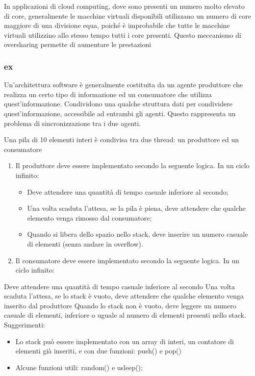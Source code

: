 \documentclass{article}
\numberwithin{equation}{subsection}
\begin{document}
In applicazioni di cloud computing, dove sono presenti un numero molto elevato di core, generalmente le macchine virtuali disponibili utilizzano un numero di core maggiore 
di una divisione equa, poiché è improbabile che tutte le macchine virtuali utilizzino allo stesso tempo tutti i core presenti. Questo meccanismo di oversharing permette 
di aumentare le prestazioni 

\subsubsection*{ex}

Un'architettura software è generalmente costituita da un agente produttore che realizza un certo tipo di informazione ed un consumatore che utilizza quest'informazione. 
Condividono una qualche struttura dati per condividere quest'informazione, accessibile ad entrambi gli agenti. Questo rappresenta un problema di sincronizzazione tra 
i due agenti. 

Una pila di 10 elementi interi è condivisa tra due thread: un produttore ed un consumatore

\begin{enumerate}
    \item Il produttore deve essere implementato secondo la seguente logica. In un ciclo infinito:
    \begin{itemize}
        \item Deve attendere una quantità di tempo casuale inferiore al secondo;
        \item Una volta scaduta l'attesa, se la pila è piena, deve attendere che qualche elemento venga rimosso dal consumatore;
        \item Quando si libera dello spazio nello stack, deve inserire un numero casuale di elementi (senza andare in overflow).
    \end{itemize}
    \item Il consumatore deve essere implementato secondo la seguente logica. In un ciclo infinito:
\end{enumerate}
Deve attendere una quantità di tempo casuale inferiore al secondo
Una volta scaduta l'attesa, se lo stack è vuoto, deve attendere che qualche elemento venga inserito dal produttore
Quando lo stack non è vuoto, deve leggere un numero casuale di elementi, inferiore o uguale al numero di elementi presenti nello stack.
Suggerimenti:
\begin{itemize}
    \item Lo stack può essere implementato con un array di interi, un contatore di elementi già inseriti, e con due funzioni: push() e pop()
    \item Alcune funzioni utili: random() e usleep();  
\end{itemize}
\end{document}
